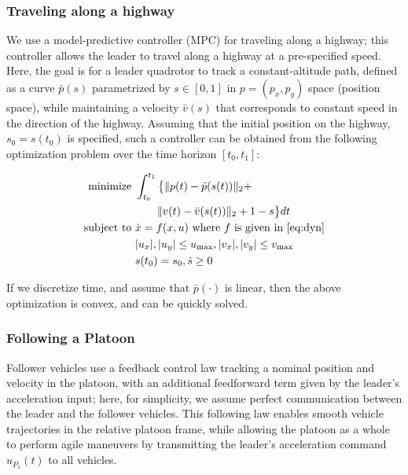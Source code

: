 \subsubsection{Traveling along a highway} \label{sec:travel_hwy}
We use a model-predictive controller (MPC) for traveling along a highway; this controller allows the leader to travel along a highway at a pre-specified speed. Here, the goal is for a leader quadrotor to track a constant-altitude path, defined as a curve $\bar{p}(s)$ parametrized by $s\in[0,1]$ in $p=(p_x, p_y)$ space (position space), while maintaining a velocity $\bar{v}(s)$ that corresponds to constant speed in the direction of the highway. Assuming that the initial position on the highway, $s_0=s(t_0)$ is specified, such a controller can be obtained from the following optimization problem over the time horizon $[t_0, t_1]$:

\begin{equation}
\begin{aligned}
\text{minimize } & \int_{t_0}^{t_1} \big\{\| p(t)-\bar{p}(s(t)) \|_2 + \\ 
&\qquad \| v(t) - \bar{v}(s(t)) \|_2 + 1-s \big\} dt \\
\text{subject to } & \dot{x} = f(x,u) \text{ where } f \text{ is given in \eqref{eq:dyn}} \\
& |u_x|, |u_y| \le u_\text{max}, |v_x|, |v_y| \le v_\text{max} \\
& s(t_0) = s_0, \dot{s} \ge 0
\end{aligned}
\end{equation}

If we discretize time, and assume that $\bar{p}(\cdot)$ is linear, then the above optimization is convex, and can be quickly solved.

\subsubsection{Following a Platoon} \label{sec:follow_platoon}
Follower vehicles use a feedback control law tracking a nominal position and velocity in the platoon, with an additional feedforward term given by the leader's acceleration input; here, for simplicity, we assume perfect communication between the leader and the follower vehicles. This following law enables smooth vehicle trajectories in the relative platoon frame, while allowing the platoon as a whole to perform agile maneuvers by transmitting the leader's acceleration command $u_{P_1}(t)$ to all vehicles.

